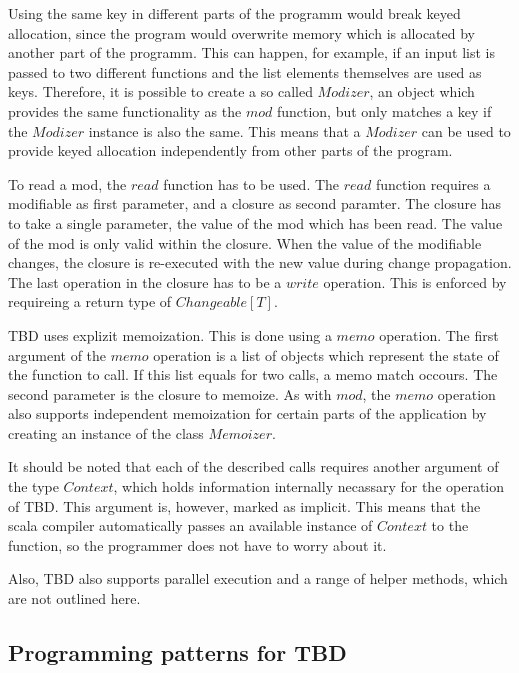 Using the same key in different parts of the programm would break keyed allocation, since the program would overwrite memory which is allocated by another part of the programm. This can happen, for example, if an input list is passed to two different functions and the list elements themselves are used as keys. Therefore, it is possible to create a so called $Modizer$, an object which provides the same functionality as the $mod$ function, but only matches a key if the $Modizer$ instance is also the same. This means that a $Modizer$ can be used to provide keyed allocation independently from other parts of the program. 

To read a mod, the $read$ function has to be used. The $read$ function requires a modifiable as first parameter, and a closure as second paramter. The closure has to take a single parameter, the value of the mod which has been read. The value of the mod is only valid within the closure. When the value of the modifiable changes, the closure is re-executed with the new value during change propagation. The last operation in the closure has to be a $write$ operation. This is enforced by requireing a return type of $Changeable[T]$. 

TBD uses explizit memoization. This is done using a $memo$ operation. The first argument of the $memo$ operation is a list of objects which represent the state of the function to call. If this list equals for two calls, a memo match occours. The second parameter is the closure to memoize. As with $mod$, the $memo$ operation also supports independent memoization for certain parts of the application by creating an instance of the class $Memoizer$.


It should be noted that each of the described calls requires another argument of the type $Context$, which holds information internally necassary for the operation of TBD. This argument is, however, marked as implicit. This means that the scala compiler automatically passes an available instance of $Context$ to the function, so the programmer does not have to worry about it.  

Also, TBD also supports parallel execution and a range of helper methods, which are not outlined here. 

\subsection{Programming patterns for TBD}

